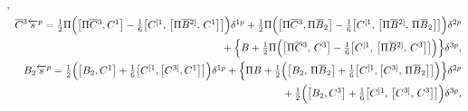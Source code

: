\documentclass[10pt]{article}
\begin{document}
\begin{eqnarray}
 , \nonumber\\
     \hspace{-0.5em}&\hspace{-0.5em}& \hspace{-0.5em} \overline{C}{}^3 \overleftarrow{s}{}^p =   \textstyle\frac{1}{2}\Pi\Big(
\big[\Pi \overline{C}{}^3, C^{1}\big]-\frac{1}{6}\big[C^{[1},\,\big[\Pi \overline{B}{}^{2]},\,C^{1}\big]\big]\Big)\delta^{1p}+ \textstyle\frac{1}{2}\Pi\Big(
\big[\Pi \overline{C}{}^3, \Pi \overline{B}_{2}\big]-\frac{1}{6}\big[C^{[1},\,\big[\Pi \overline{B}{}^{2]},\,\Pi \overline{B}_{2}\big]\big]\Big)\delta^{2p}\nonumber \\
 \hspace{-0.5em}&\hspace{-0.5em}& \hspace{-0.5em} \phantom{\overline{C}{}^3 \overleftarrow{s}{}^r}+\Big\{{B} +\textstyle\frac{1}{2} \Pi\Big(
\big[\Pi \overline{C}{}^3,\, C^{3}\big]-\frac{1}{6}\big[C^{[1},\,\big[\Pi \overline{B}{}^{2]},\,C^{3}\big]\big]\Big)\Big\}\delta^{3p} ,  \label{N3algBRST1} \\
  &&   B_2  \overleftarrow{s}{}^p =  \textstyle\frac{1}{2}\Big(
\big[B_2, C^{1}\big]+\frac{1}{6}\big[C^{[1},\big[C^{3]},C^{1}\big]\big]\Big)\delta^{1p} + \Big\{\Pi{B} +\textstyle\frac{1}{2}\Big(
\big[B_2,\, \Pi\overline{B}_2\big]+\frac{1}{6}\big[C^{[1},\big[{C}^{3]},\, \Pi\overline{B}_{2}\big]\big]\Big)\Big\}\delta^{2p}\nonumber \\
\hspace{-0.5em}&\hspace{-0.5em}& \hspace{-0.5em} \phantom{B_2  \overleftarrow{s}{}^r}   + \textstyle\frac{1}{2}\Big(
\big[B_2, C^{3}\big]+\frac{1}{6}\big[C^{[1},\,\big[{C}^{3]},\,C^{3}\big]\big]\Big)\delta^{3p},  \label{N3algBRST2}
\end{eqnarray}
\end{document}
